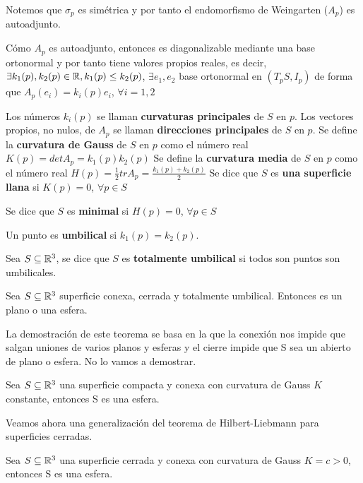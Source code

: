 Notemos que $\sigma_p$ es simétrica y por tanto el endomorfismo de Weingarten ($A_p$) es autoadjunto.

Cómo $A_p$ es autoadjunto, entonces es diagonalizable mediante una base ortonormal y por tanto tiene valores propios reales, es decir, $\exists k_1(p), k_2(p) \in \mathbb{R}, k_1(p) \leq k_2(p)$, $\exists {e_1,e_2}$ base ortonormal en $(T_pS, I_p)$ de forma que $A_p(e_i) = k_i(p)e_i$, $\forall i = 1,2$

Los números $k_i(p)$ se llaman \textbf{curvaturas principales} de $S$ en $p$.
Los vectores propios, no nulos, de $A_p$ se llaman \textbf{direcciones principales} de $S$ en $p$.
Se define la \textbf{curvatura de Gauss} de $S$ en $p$ como el número real $K(p)=det A_p=k_1(p)k_2(p)$
Se define la \textbf{curvatura media} de $S$ en $p$ como el número real $H(p)=\frac{1}{2}tr A_p=\frac{k_1(p)+k_2(p)}{2}$
Se dice que $S$ es \textbf{una superficie llana} si $K(p)=0$, $\forall p \in S$

\begin{definition}
Se dice que $S$ es \textbf{minimal} si $H(p)=0$, $\forall p \in S$

Un punto es \textbf{umbilical} si $k_1(p)=k_2(p)$.

Sea $S \subseteq \mathbb{R}^3$, se dice que $S$ es \textbf{totalmente umbilical} si todos son puntos son umbilicales.
\end{definition}

\begin{theorem}\label{umbilicaltheorem}
Sea $S \subseteq \mathbb{R}^3$ superficie conexa, cerrada y totalmente umbilical. Entonces es un plano o una esfera.
\end{theorem}

La demostración de este teorema se basa en la que la conexión nos impide que salgan uniones de varios planos y esferas y el cierre impide que S sea un abierto de plano o esfera. No lo vamos a demostrar.

\begin{theorem}
Sea $S \subseteq \mathbb{R}^3$ una superficie compacta y conexa con curvatura de Gauss $K$ constante, entonces S es una esfera.
\end{theorem}

Veamos ahora una generalización del teorema de Hilbert-Liebmann para superficies cerradas.
\begin{theorem}
Sea $S \subseteq \mathbb{R}^3$ una superficie cerrada y conexa con curvatura de Gauss $K=c > 0$, entonces S es una esfera.
\end{theorem}


